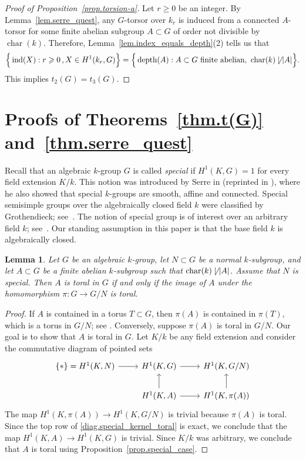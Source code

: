 \documentclass[12pt]{amsart}
\numberwithin{equation}{section}
\newtheorem{lemma}[theorem]{Lemma}
\theoremstyle{remark}
\newcommand{\ind}{\operatorname{ind}}
\newcommand{\Char}{\operatorname{char}}
\newcommand{\depth}{\operatorname{depth}}
\begin{document}
\begin{proof}[Proof of Proposition~\ref{prop.torsion-a}]
    Let $r\geqslant 0$ be an integer. By Lemma~\ref{lem.serre_quest}, any $G$-torsor over $k_r$ is induced from a connected $A$-torsor for some finite abelian subgroup $A\subset G$ of order not divisible by $\Char(k)$.  
    Therefore, Lemma~\ref{lem.index_equals_depth}(2) tells us that
    $$\Big\{ \ind(X) : r\geqslant 0\, , X\in H^1(k_r,G)\Big\} = \Big\{ \depth(A) : A\subset G \text{ finite abelian, }\Char(k)\not\mid|A|\Big\}.$$
    This implies $t_2(G) = t_3(G)$.
\end{proof} 



\section{Proofs of Theorems~\ref{thm.t(G)} and~\ref{thm.serre_quest}} 
\label{sect.t(G)}

Recall that an algebraic $k$-group $G$ is called {\em special} if $H^1(K, G) = 1$ for every field extension $K/k$. This notion was introduced by Serre in \cite{serre-special} (reprinted in \cite{serre-reprinted}), where he also showed that special $k$-groups are smooth, affine and connected. Special semisimple groups over the algebraically closed field $k$ were classified by Grothendieck; see~\cite[Theorem 3]{grothendieck-special}.
The notion of special group is of interest over an arbitrary field $k$; see~\cite{huruguen-special, reichstein-tossici-special, merkurjev-special}. Our
standing assumption in this paper is that the base field $k$ is algebraically closed.

\begin{lemma}\label{lem.special_kernel_torality}
    Let $G$ be an algebraic $k$-group, let $N\subset G$ be a normal $k$-subgroup, and let $A\subset G$ be a finite abelian $k$-subgroup such that $\Char(k)\not\mid |A|$. Assume that $N$ is special. Then $A$ is toral in $G$ if and only if the image of $A$ under the homomorphism $\pi\colon G\to G/N$ is toral.
\end{lemma}
\begin{proof}
   If $A$ is contained in a torus $T\subset G$, then $\pi(A)$ is contained in $\pi(T)$, which is a torus in $G/N$; see \cite[Theorem 12.9]{milne2017algebraic}.  Conversely, suppose $\pi(A)$ is toral in $G/N$. Our goal is to show that $A$ is toral in $G$. Let $K/k$ be any field extension and consider the commutative diagram of pointed sets
\begin{equation}\label{diag.special_kernel_toral}
    \begin{tikzcd}
           {\{\ast\}}=H^1(K,N)\arrow[r] & H^1(K,G)\arrow[r]& H^1(K,G/N)\\
            & H^1(K,A) \arrow[u]\arrow[r] & H^1(K,\pi(A)) \arrow[u]
    \end{tikzcd}
\end{equation}
    The map $H^1(K,\pi(A))\to H^1(K,G/N)$ is trivial because $\pi(A)$ is toral. Since the top row of \eqref{diag.special_kernel_toral} is exact, we conclude that the map $H^1(K,A)\to H^1(K,G)$ is trivial.  Since $K/k$ was arbitrary, we conclude that $A$ is toral using Proposition~\ref{prop.special_case}.
\end{proof}
\end{document}
